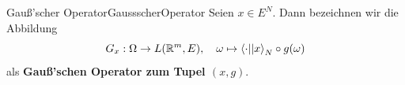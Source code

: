 \begin{definition}{Gauß'scher Operator}{GaussscherOperator}
Seien $x \in E^N$. Dann bezeichnen wir die Abbildung
\[G_x : \Omega \rightarrow L(\mathbb{R}^m, E), \quad
        \omega \mapsto \left\langle \cdot ||x\right\rangle_N \circ g(\omega)\]
als \textbf{Gauß'schen Operator zum Tupel $(x,g)$}.
\end{definition}